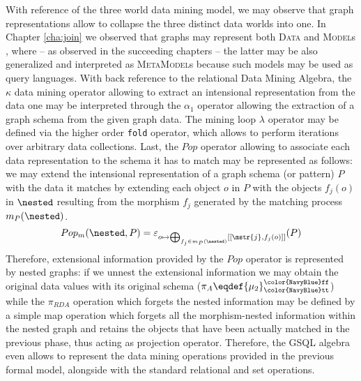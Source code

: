 With reference of the three world data mining model, we may observe that graph representations allow to collapse the three distinct data worlds into one. In Chapter \vref{cha:join} we observed that graphs may represent both \textsc{Data} and \textsc{Model}s , where -- as observed in the succeeding chapters -- the latter may be also generalized and interpreted as \textsc{MetaModel}s  because such models may be used as query languages. With back reference to the relational Data Mining Algebra, the $\kappa$ data mining operator allowing to extract an intensional representation from the data one may be interpreted through the $\alpha_1$ operator allowing the extraction of a graph schema from the given graph data. The mining loop $\lambda$ operator may be defined via the higher order \texttt{fold} operator, which allows to perform iterations over arbitrary data collections. Last, the $Pop$ operator allowing to associate each data representation to the schema it has to match may be represented as follows: we may extend the intensional representation of a graph schema (or pattern) $P$ with the data it matches by extending each object $o$ in $P$ with the objects $f_j(o)$ in $\nested$ resulting from the morphism $f_j$ generated by the matching process $m_P(\nested)$.
\begin{equation}
Pop_m(\nested,P)=\varepsilon_{o\mapsto\bigoplus_{f_j\in m_P(\nested)}[[\mstr{j},f_j(o) ]]}(P)\label{eq:popGraph}
\end{equation}
Therefore, extensional information provided by the $Pop$ operator is represented by nested graphs: if we unnest the extensional information we may obtain the original data values with its original schema ($\pi_A\eqdef{\mu_2}^{\texttt{\color{NavyBlue}ff}}_{\texttt{\color{NavyBlue}tt}}$) 
while the $\pi_{RDA}$ operation which forgets the nested information may be defined by a simple map operation which forgets all the morphism-nested information within the nested graph and retains the objects that have been actually matched in the previous phase, thus acting  as projection operator. Therefore, the GSQL algebra even allows to represent the data mining operations provided in the previous formal model, alongside with the standard relational and set operations.

